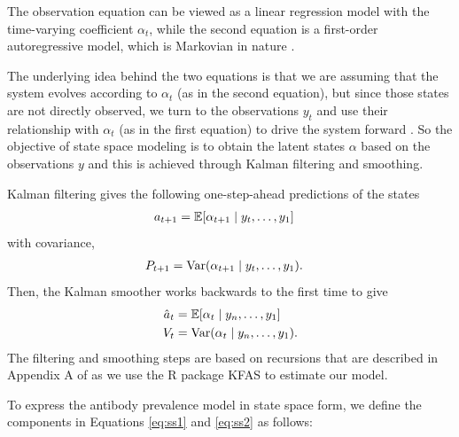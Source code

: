 \documentclass{article}
\begin{document}
The observation equation can be viewed as a linear regression model with the
time-varying coefficient $\alpha_t$, while the second equation is a first-order
autoregressive model, which is Markovian in nature \citep{durbin2012time}. 

The underlying idea behind the two equations is that we are assuming that the
system evolves according to $\alpha_t$ (as in the second equation), 
but since those states are
not directly observed, we turn to the observations $y_t$ and use their
relationship with $\alpha_t$ (as in the first equation) to drive the system
forward \citep{durbin2012time}. So the objective of state space modeling is to
obtain the latent states $\alpha$ based on the observations $y$ and this is
achieved through Kalman filtering and smoothing. 

Kalman filtering gives the following one-step-ahead predictions of the states
\begin{align*}
a_{t+1} &= \mathbb{E}[\alpha_{t+1}\mid y_t, \dots, y_1] 
\end{align*} with covariance,
\begin{align*}
P_{t+1} &= \operatorname{Var}(\alpha_{t+1} \mid y_t, \dots, y_1).
\end{align*}
Then, the Kalman smoother works backwards to the first time to give
\begin{align}
\hat{a}_t &= \mathbb{E}[\alpha_{t}\mid y_n, \dots, y_1] \label{eq:hatat}\\
V_t &= \operatorname{Var}(\alpha_{t}\mid y_n, \dots, y_1). \label{eq:Vt}
\end{align}
The filtering and smoothing steps are based on recursions that are described in
Appendix A of \citet{helske2017kfas} as we use the R package KFAS to estimate
our model.


To express the antibody prevalence model in state space form, we define
 the components in Equations \ref{eq:ss1} and \ref{eq:ss2} as follows:

\end{document}
